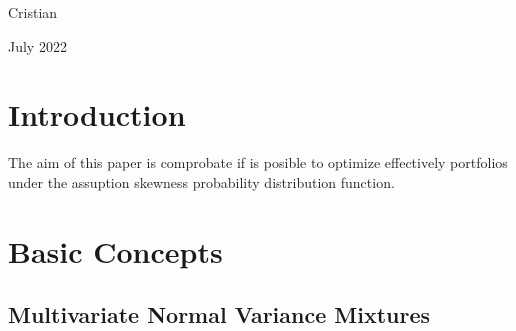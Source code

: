 \documentclass[12pt]{article}
\begin{document}
\begin{titlepage}
\begin{center}
\begin{large}
Cristian\\
\end{large}
\vspace*{0.3in}


\begin{large}
July 2022
\end{large}
\vspace*{0.3in}



\end{center}

\end{titlepage}



\newpage








\section{Introduction}

The aim of this paper is comprobate if is posible to optimize  effectively  portfolios under 
the assuption skewness probability distribution function.







\section{Basic Concepts}





\subsection{Multivariate Normal Variance Mixtures}
\end{document}
